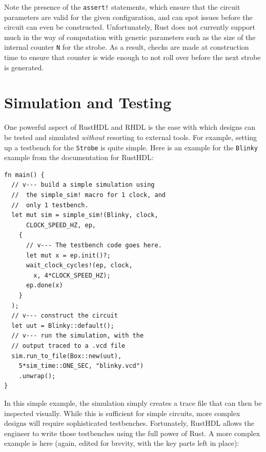 \documentclass[conference]{IEEEtran}
\begin{document}
Note the presence of the \verb|assert!| statements, which ensure that the circuit parameters are valid for the given configuration, and
can spot issues before the circuit can even be constructed.  Unfortunately, Rust does not currently support much in the way of computation with generic parameters such as the 
size of the internal counter \verb|N| for the strobe.  As a result, checks are made at construction time to ensure that 
counter is wide enough to not roll over before the next strobe is generated.

\section{Simulation and Testing}

One powerful aspect of RustHDL and RHDL is the ease with which designs can be tested and simulated \emph{without} 
resorting to external tools.  For example, setting up a testbench for the \verb|Strobe| is quite simple.  Here is an example
for the \verb|Blinky| example from the documentation for RustHDL:

\begin{verbatim}
fn main() {
  // v--- build a simple simulation using
  //  the simple_sim! macro for 1 clock, and
  //  only 1 testbench.
  let mut sim = simple_sim!(Blinky, clock, 
      CLOCK_SPEED_HZ, ep, 
    {
      // v--- The testbench code goes here.
      let mut x = ep.init()?;
      wait_clock_cycles!(ep, clock, 
        x, 4*CLOCK_SPEED_HZ);
      ep.done(x)
    }
  );
  // v--- construct the circuit
  let uut = Blinky::default();
  // v--- run the simulation, with the 
  // output traced to a .vcd file
  sim.run_to_file(Box::new(uut), 
    5*sim_time::ONE_SEC, "blinky.vcd")
    .unwrap();
}
\end{verbatim}

In this simple example, the simulation simply creates a trace file that can then be inspected visually.  While this 
is sufficient for simple circuits, more complex designs will require sophisticated testbenches.  Fortunately, RustHDL
allows the engineer to write those testbenches using the full power of Rust.  A more complex example is here (again, edited for
brevity, with the key parts left in place):
\end{document}
